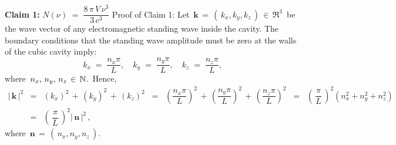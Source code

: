 \vskip 0.4cm
\noindent
\textbf{Claim 1:}\;
$
N(\nu)
\; = \;
    \dfrac{
        8\,\pi\,V\,\nu^{3}
        }{
        3\,c^{3}
        }
$
\vskip 0.1cm
\noindent
Proof of Claim 1:\;
Let
\,$\mathbf{k} \,=\, (\,k_{x}, k_{y}, k_{z}\,) \,\in\, \Re^{3}$\,
be the wave vector of any electromagnetic standing wave
inside the cavity.
The boundary conditions that the standing wave amplitude must
be zero at the walls of the cubic cavity imply:
\begin{equation*}
k_{x} \;=\; \dfrac{n_{x}\pi}{L},
\quad
k_{y} \;=\; \dfrac{n_{y}\pi}{L},
\quad
k_{z} \;=\; \dfrac{n_{z}\pi}{L},
\end{equation*}
where
\,$n_{x},\, n_{y},\, n_{z} \,\in\, \mathbb{N}$.\,
Hence,
\begin{eqnarray*}
\vert\,\mathbf{k}\,\vert^{2}
& = &
    \left(k_{x}\right)^{2}
    \,+\,
    \left(k_{y}\right)^{2}
    \,+\,
    \left(k_{z}\right)^{2}
\;\; = \;\;
    \left(\dfrac{n_{x}\pi}{L}\right)^{2}
    \,+\,
    \left(\dfrac{n_{y}\pi}{L}\right)^{2}
    \,+\,
    \left(\dfrac{n_{z}\pi}{L}\right)^{2}
\;\; = \;\;
    \left(\,\dfrac{\pi}{L}\,\right)^{2}
    \left(n_{x}^{2}+n_{y}^{2}+n_{z}^{2}\right)
\\
& = &
    \left(\,\dfrac{\pi}{L}\,\right)^{2}
    \vert\,\mathbf{n}\,\vert^{2}\,,
\end{eqnarray*}
where
\,$\mathbf{n} \,=\, (\,n_{x},n_{y},n_{z}\,)$.\,

